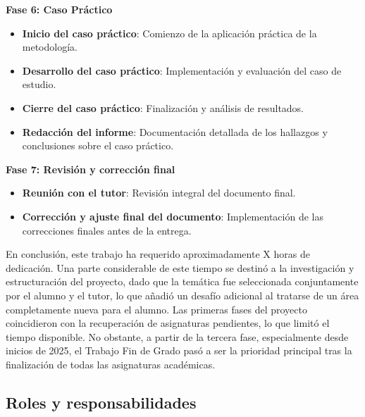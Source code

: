 \documentclass[a4paper, 10pt]{article}
\begin{document}
\vspace{0.5cm}

\textbf{Fase 6: Caso Práctico}
\begin{itemize}
    \item \textbf{Inicio del caso práctico}: Comienzo de la aplicación práctica de la metodología.
    \item \textbf{Desarrollo del caso práctico}: Implementación y evaluación del caso de estudio.
    \item \textbf{Cierre del caso práctico}: Finalización y análisis de resultados.
    \item \textbf{Redacción del informe}: Documentación detallada de los hallazgos y conclusiones sobre el caso práctico.
\end{itemize}

\vspace{0.5cm}

\textbf{Fase 7: Revisión y corrección final}
\begin{itemize}
    \item \textbf{Reunión con el tutor}: Revisión integral del documento final.
    \item \textbf{Corrección y ajuste final del documento}: Implementación de las correcciones finales antes de la entrega.
\end{itemize}

\vspace{0.5cm}

En conclusión, este trabajo ha requerido aproximadamente X horas de dedicación. Una parte considerable de este tiempo se destinó a la investigación y estructuración del proyecto, dado que la temática fue seleccionada conjuntamente por el alumno y el tutor, lo que añadió un desafío adicional al tratarse de un área completamente nueva para el alumno. Las primeras fases del proyecto coincidieron con la recuperación de asignaturas pendientes, lo que limitó el tiempo disponible. No obstante, a partir de la tercera fase, especialmente desde inicios de 2025, el Trabajo Fin de Grado pasó a ser la prioridad principal tras la finalización de todas las asignaturas académicas.






\subsection{Roles y responsabilidades}
\end{document}
